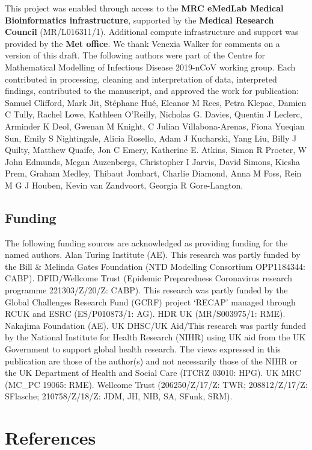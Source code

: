 \documentclass[
]{article}
\begin{document}
This project was enabled through access to the \textbf{MRC eMedLab
Medical Bioinformatics infrastructure}, supported by the \textbf{Medical
Research Council} (MR/L016311/1). Additional compute infrastructure and
support was provided by the \textbf{Met office}. We thank Venexia Walker
for comments on a version of this draft. The following authors were part
of the Centre for Mathematical Modelling of Infectious Disease 2019-nCoV
working group. Each contributed in processing, cleaning and
interpretation of data, interpreted findings, contributed to the
manuscript, and approved the work for publication: Samuel Clifford, Mark
Jit, Stéphane Hué, Eleanor M Rees, Petra Klepac, Damien C Tully, Rachel
Lowe, Kathleen O'Reilly, Nicholas G. Davies, Quentin J Leclerc, Arminder
K Deol, Gwenan M Knight, C Julian Villabona-Arenas, Fiona Yueqian Sun,
Emily S Nightingale, Alicia Rosello, Adam J Kucharski, Yang Liu, Billy J
Quilty, Matthew Quaife, Jon C Emery, Katherine E. Atkins, Simon R
Procter, W John Edmunds, Megan Auzenbergs, Christopher I Jarvis, David
Simons, Kiesha Prem, Graham Medley, Thibaut Jombart, Charlie Diamond,
Anna M Foss, Rein M G J Houben, Kevin van Zandvoort, Georgia R
Gore-Langton.

\hypertarget{funding}{%
\subsection{Funding}\label{funding}}

The following funding sources are acknowledged as providing funding for
the named authors. Alan Turing Institute (AE). This research was partly
funded by the Bill \& Melinda Gates Foundation (NTD Modelling Consortium
OPP1184344: CABP). DFID/Wellcome Trust (Epidemic Preparedness
Coronavirus research programme 221303/Z/20/Z: CABP). This research was
partly funded by the Global Challenges Research Fund (GCRF) project
`RECAP' managed through RCUK and ESRC (ES/P010873/1: AG). HDR UK
(MR/S003975/1: RME). Nakajima Foundation (AE). UK DHSC/UK Aid/This
research was partly funded by the National Institute for Health Research
(NIHR) using UK aid from the UK Government to support global health
research. The views expressed in this publication are those of the
author(s) and not necessarily those of the NIHR or the UK Department of
Health and Social Care (ITCRZ 03010: HPG). UK MRC (MC\_PC 19065: RME).
Wellcome Trust (206250/Z/17/Z: TWR; 208812/Z/17/Z: SFlasche;
210758/Z/18/Z: JDM, JH, NIB, SA, SFunk, SRM).

\hypertarget{references}{%
\section*{References}\label{references}}
\end{document}
